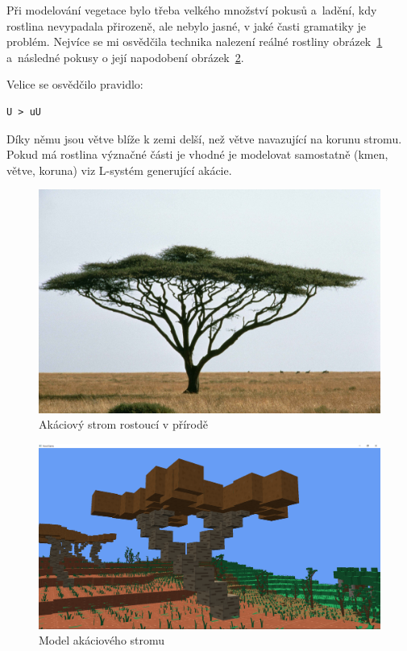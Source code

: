 \documentclass[thesis=M,czech]{FITthesis}[2019/12/23]
\begin{document}
Při modelování vegetace bylo třeba velkého množství pokusů a~ladění, kdy rostlina nevypadala přirozeně, ale nebylo jasné, v jaké časti gramatiky je problém. Nejvíce se mi osvědčila technika nalezení reálné rostliny obrázek~\ref{fig:acacia_nature} a~následné pokusy o její napodobení obrázek~\ref{fig:acacia_engine}.

Velice se osvědčilo pravidlo:

\begin{verbatim}
U > uU
\end{verbatim}

Díky němu jsou větve blíže k zemi delší, než větve navazující na korunu stromu. Pokud má rostlina význačné části je vhodné je modelovat samostatně (kmen, větve, koruna) viz L-systém generující akácie.

\begin{figure}\centering
	\includegraphics[width=\textwidth]{images/acacia_nature}
	\caption[Akáciový strom rostoucí v přírodě]{Akáciový strom rostoucí v přírodě~\cite{acacia}}\label{fig:acacia_nature}
\end{figure}

\begin{figure}\centering
	\includegraphics[width=\textwidth]{images/acacia_engine}
	\caption[Model akáciového stromu]{Model akáciového stromu}\label{fig:acacia_engine}
\end{figure}
\end{document}
